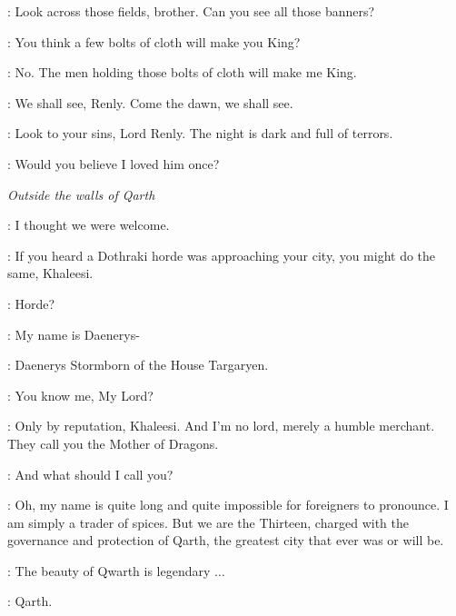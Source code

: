 \RENLY: Look across those fields, brother. Can you see all those banners? 

\STANNIS: You think a few bolts of cloth will make you King? 

\RENLY: No. The men holding those bolts of cloth will make me King. 

\STANNIS: We shall see, Renly. Come the dawn, we shall see. 

\MELISANDRE: Look to your sins, Lord Renly. The night is dark and full of terrors. 


\RENLY: Would you believe I loved him once? 



\scene

\textit{Outside the walls of Qarth} 


\DAENERYS: I thought we were welcome. 

\JORAH: If you heard a Dothraki horde was approaching your city, you might do the same, Khaleesi. 

\DAENERYS: Horde? 



\DAENERYS: My name is Daenerys- 

\SPICEKING:  Daenerys Stormborn of the House Targaryen. 

\DAENERYS: You know me, My Lord?

\SPICEKING: Only by reputation, Khaleesi. And I'm no lord, merely a humble merchant. They call you the Mother of Dragons. 

\DAENERYS: And what should I call you? 

\SPICEKING: Oh, my name is quite long and quite impossible for foreigners to pronounce. I am simply a trader of spices. But we are the Thirteen, charged with the governance and protection of Qarth, the greatest city that ever was or will be. 

\DAENERYS: The beauty of Qwarth is legendary $\ldots$  

\SPICEKING:  Qarth. 

